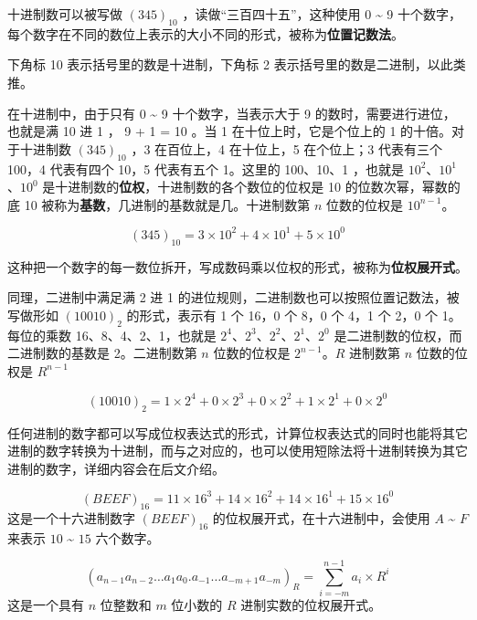 十进制数可以被写做 $(345)_{10}$ ，读做“三百四十五”，这种使用 0 \textasciitilde{} 9 十个数字，每个数字在不同的数位上表示的大小不同的形式，被称为\textbf{位置记数法}。

\begin{remark}{}{}
  下角标 10 表示括号里的数是十进制，下角标 2 表示括号里的数是二进制，以此类推。
\end{remark}

在十进制中，由于只有 0 \textasciitilde{} 9 十个数字，当表示大于 9 的数时，需要进行进位，也就是满 10 进 1 ， 9 + 1 = 10 。当 1 在十位上时，它是个位上的 1 的十倍。对于十进制数 $(345)_{10}$ ，3 在百位上，4 在十位上，5 在个位上；3 代表有三个 100，4 代表有四个 10，5 代表有五个 1。这里的 100、10、1 ，也就是 $10 ^ 2$、$10 ^ 1$、$10 ^ 0$ 是十进制数的\textbf{位权}，十进制数的各个数位的位权是 10 的位数次幂，幂数的底 10 被称为\textbf{基数}，几进制的基数就是几。十进制数第 $n$ 位数的位权是 $10 ^ {n-1}$。

$$ (345)_{10} = 3 \times 10 ^ 2 + 4 \times 10 ^ 1 + 5 \times 10 ^ 0 $$

\begin{note}{}{}
  这种把一个数字的每一数位拆开，写成数码乘以位权的形式，被称为\textbf{位权展开式}。
\end{note}

同理，二进制中满足满 2 进 1 的进位规则，二进制数也可以按照位置记数法，被写做形如 $(10010)_{2}$ 的形式，表示有 1 个 16，0 个 8，0 个 4，1 个 2，0 个 1。每位的乘数 16、8、4、2、1，也就是 $2 ^ 4$、$2 ^ 3$、$2 ^ 2$、$2 ^ 1$、$2 ^ 0$ 是二进制数的位权，而二进制数的基数是 2。二进制数第 $n$ 位数的位权是 $2 ^ {n-1}$。$R$ 进制数第 $n$ 位数的位权是 $R ^ {n-1}$

$$ (10010)_{2} = 1 \times 2 ^ 4 + 0 \times 2 ^ 3 + 0 \times 2 ^ 2 + 1 \times 2 ^ 1 + 0 \times 2 ^ 0 $$

\begin{note}{}{}
  任何进制的数字都可以写成位权表达式的形式，计算位权表达式的同时也能将其它进制的数字转换为十进制，而与之对应的，也可以使用短除法将十进制转换为其它进制的数字，详细内容会在后文介绍。
\end{note}

\begin{example}{}{}
  $$(BEEF)_{16} = 11 \times 16 ^ 3 + 14 \times 16 ^ 2 + 14 \times 16 ^ 1 + 15 \times 16 ^ 0$$
  这是一个十六进制数字 $(BEEF)_{16}$ 的位权展开式，在十六进制中，会使用 $A$ \textasciitilde{} $F$ 来表示 $10$ \textasciitilde{} $15$ 六个数字。
\end{example}

\begin{example}{}{}
  $$ (a_{n-1} ​a_{n-2} \dots a_{1​} a_{0} . a_{-1} \dots a_{-m+1} a_{-m}​)_R​ = \sum_{i=-m}^{n-1} a_i \times R^{i} $$
  这是一个具有 $n$ 位整数和 $m$ 位小数的 $R$ 进制实数的位权展开式。
\end{example}


